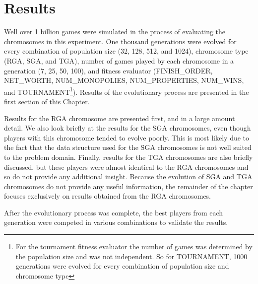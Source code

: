 \clearpage
\chapter{Results}\label{chap:results}

Well over 1 billion games were simulated in the process of evaluating the
chromosomes in this experiment. One thousand generations were evolved for every
combination of population size (32, 128, 512, and 1024), chromosome type (RGA,
SGA, and TGA), number of games played by each chromosome in a generation (7, 25,
50, 100), and fitness evaluator (FINISH\_ORDER, NET\_WORTH, NUM\_MONOPOLIES,
NUM\_PROPERTIES, NUM\_WINS, and TOURNAMENT\footnote{For the tournament fitness
evaluator the number of games was determined by the population size and was not
independent. So for TOURNAMENT, 1000 generations were evolved for every
combination of population size and chromosome type}). Results of the
evolutionary process are presented in the first section of this Chapter.

Results for the RGA chromosome are presented first, and in a large amount
detail. We also look briefly at the results for the SGA chromosomes, even though
players with this chromosome tended to evolve poorly. This is most likely due to
the fact that the data structure used for the SGA chromosomes is not well suited
to the problem domain. Finally, results for the TGA chromosomes are also briefly
discussed, but these players were almost identical to the RGA chromosomes and so
do not provide any additional insight. Because the evolution of SGA and TGA
chromosomes do not provide any useful information, the remainder of the chapter
focuses exclusively on results obtained from the RGA chromosomes.

After the evolutionary process was complete, the best players from each
generation were competed in various combinations to validate the results. 

